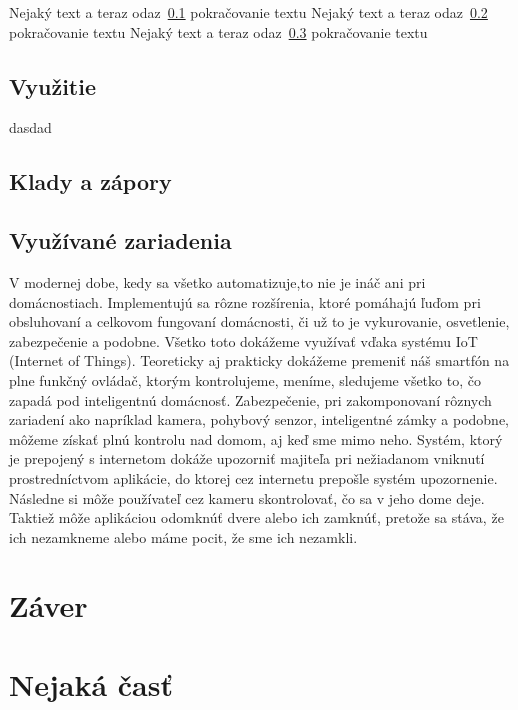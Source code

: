 \documentclass[10pt,twoside,slovak,a4paper]{article}
\begin{document}
Nejaký text a teraz odaz~\ref{zabezpečenie:vyhody} pokračovanie textu
Nejaký text a teraz odaz~\ref{zabezpečenie:druhy} pokračovanie textu
Nejaký text a teraz odaz~\ref{zabezpečenie:nástroje} pokračovanie textu

\subsection{Využitie}\label{zabezpečenie:vyhody}
dasdad
\subsection{Klady a zápory}\label{zabezpečenie:druhy}

\subsection{Využívané zariadenia}\label{zabezpečenie:nástroje}



V modernej dobe, kedy sa všetko automatizuje,to nie je ináč ani pri domácnostiach. Implementujú sa rôzne rozšírenia, ktoré pomáhajú ľuďom pri obsluhovaní a celkovom fungovaní domácnosti, či už to je vykurovanie, osvetlenie, zabezpečenie a podobne. Všetko toto dokážeme využívať vďaka systému IoT (Internet of Things). Teoreticky aj prakticky dokážeme premeniť náš smartfón na plne funkčný ovládač, ktorým kontrolujeme, meníme, sledujeme všetko to, čo zapadá pod inteligentnú domácnosť.  Zabezpečenie, pri zakomponovaní rôznych zariadení ako napríklad kamera, pohybový senzor, inteligentné zámky a podobne, môžeme získať plnú kontrolu nad domom, aj keď sme mimo neho. Systém, ktorý je prepojený s internetom dokáže upozorniť majiteľa pri nežiadanom vniknutí prostredníctvom aplikácie, do ktorej cez internetu prepošle systém upozornenie. Následne si môže používateľ cez kameru skontrolovať, čo sa v jeho dome deje. Taktiež môže aplikáciou odomknúť dvere alebo ich zamknúť, pretože sa stáva, že ich nezamkneme alebo máme pocit, že sme ich nezamkli.


\section{Záver} \label{zaver}




\section{Nejaká časť} \label{nejaka}
\end{document}
